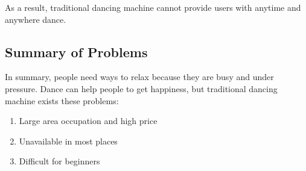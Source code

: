 As a result, traditional dancing machine cannot provide users with anytime and
anywhere dance. 

\subsection{Summary of Problems}

In summary, people need ways to relax because they are busy and under pressure.
Dance can help people to get happiness, but traditional dancing machine exists
these problems: 

\begin{enumerate}
    \item Large area occupation and high price
    \item Unavailable in most places
    \item Difficult for beginners
\end{enumerate}

